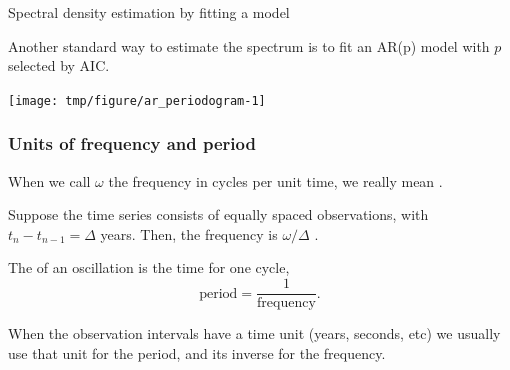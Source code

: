 \begin{frame}[fragile]{Spectral density estimation by fitting a model}

Another standard way to estimate the spectrum is to fit an AR(p) model with $p$ selected by AIC.

\vspace{-2mm}

\begin{knitrout}\small
{}\color{fgcolor}\begin{kframe}
\begin{alltt}
\hldef{=}\hldef{,}
  \hldef{=}\hldef{)}
\end{alltt}
\end{kframe}
\end{knitrout}

\vspace{-2mm}

\begin{knitrout}\small
{}\color{fgcolor}

{\centering \texttt{[image: tmp/figure/ar\_periodogram-1]} 

}


\end{knitrout}

\end{frame}

\begin{frame}[fragile]

\frametitle{Units of frequency and period}

\bi

\item When we call $\omega$ the frequency in cycles per unit time, we really mean .

\item  Suppose the time series consists of equally spaced observations, with $t_{n}-t_{n-1}=\Delta$ years. Then, the frequency is $\omega/\Delta$ . 

\item  The  of an oscillation is the time for one cycle,
\begin{equation} \mbox{period} = \frac{1}{\mbox{frequency}}.\end{equation}

\item  When the observation intervals have a time unit (years, seconds, etc) we usually use that unit for the period, and its inverse for the frequency.

\ei

\end{frame}

